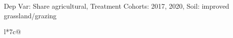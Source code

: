 \begin{table}[H]
\captionlistentry[table]{}
\label{table:beaver_land_class_DVis_land_class_1_SCg23_SSIGRG}
\scriptsize %
Dep Var: Share agricultural, Treatment Cohorts: 2017, 2020, Soil: improved grassland/grazing \\
\begin{threeparttable}
\begin{tabulary}{\textwidth}{l*{7}{c}@{}}
\toprule \toprule
\noalign{\smallskip}
\noalign{\smallskip}
\midrule \bottomrule
\end{tabulary}
\medskip
\end{threeparttable}
\end{table}
